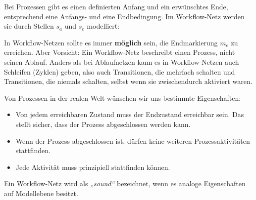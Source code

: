 Bei Prozessen gibt es einen definierten Anfang und ein erwünschtes Ende, entsprechend eine Anfangs- und eine Endbedingung. Im Workflow-Netz werden sie durch Stellen $s_a$ und $s_e$ modelliert:


In Workflow-Netzen sollte es immer \textbf{möglich} sein, die Endmarkierung $m_e$ zu erreichen. Aber Vorsicht: Ein Workflow-Netz beschreibt einen Prozess, nicht seinen Ablauf. Anders als bei Ablaufnetzen kann es in Workflow-Netzen auch Schleifen (Zyklen) geben, also auch Transitionen, die mehrfach schalten und Transitionen, die niemals schalten, selbst wenn sie zwischendurch aktiviert waren.

Von Prozessen in der realen Welt wünschen wir uns bestimmte Eigenschaften: 
\begin{itemize}
	\item Von jedem erreichbaren Zustand muss der Endzustand erreichbar sein. Das stellt sicher, dass der Prozess abgeschlossen werden kann.
	\item Wenn der Prozess abgeschlossen ist, dürfen keine weiteren Prozessaktivitäten stattfinden. 
	\item Jede Aktivität muss prinzipiell stattfinden können.
\end{itemize}


Ein Workflow-Netz wird als \textit{„sound“} bezeichnet, wenn es analoge Eigenschaften auf Modellebene besitzt.


